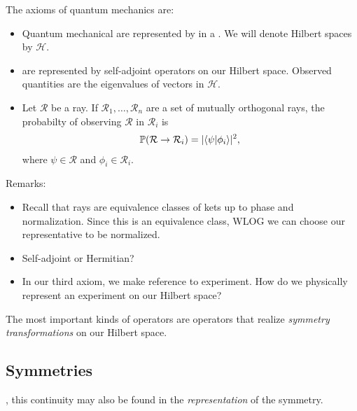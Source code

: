 \documentclass[11pt]{article}
\begin{document}
\begin{iidea}
    The axioms of quantum mechanics are:
    \begin{itemize}
        \item Quantum mechanical  are represented by 
        in a . We will denote Hilbert spaces by $\mathcal{H}$.
        \item {} are represented by self-adjoint operators on
        our Hilbert space. Observed quantities are the eigenvalues of vectors in $\mathcal{H}$.
        \item Let $\mathcal{R}$ be a ray. If $\mathcal{R}_1, \ldots, \mathcal{R}_n$ are a
        set of mutually orthogonal rays, the probabilty of observing $\mathcal{R}$ in
        $\mathcal{R}_i$ is
        \begin{align*}
            \mathbb{P}(\mathcal{R} \to \mathcal{R}_i) = | \langle \psi | \phi_i \rangle |^2,
        \end{align*}
        where $\psi \in \mathcal{R}$ and $\phi_i \in \mathcal{R}_i$.
    \end{itemize}
\end{iidea}

\noin
Remarks:

\begin{itemize}
    \item Recall that rays are equivalence classes of kets up to
    phase and normalization. Since this is an equivalence class,
    WLOG we can choose our representative to be normalized.
    \item Self-adjoint or Hermitian? 
    \item In our third axiom, we make reference to experiment.
    How do we physically represent an experiment on our Hilbert space?
\end{itemize}

The most important kinds of operators are operators that realize
\emph{symmetry transformations} on our Hilbert space.


\subsection{Symmetries}


, this continuity may also be found in the
\emph{representation} of the symmetry.
\end{document}
